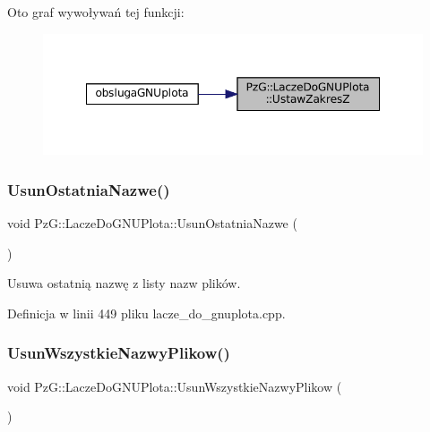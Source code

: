 Oto graf wywoływań tej funkcji\+:\nopagebreak
\begin{figure}[H]
\begin{center}
\leavevmode
\includegraphics[width=348pt]{class_pz_g_1_1_lacze_do_g_n_u_plota_a1dbbb2b86fb13b8632e6bad9df2a82e3_icgraph}
\end{center}
\end{figure}
\mbox{\label{class_pz_g_1_1_lacze_do_g_n_u_plota_a75f599f17413ea8602c6dbba09f36407}} 
\subsubsection{\texorpdfstring{UsunOstatniaNazwe()}{UsunOstatniaNazwe()}}
{\footnotesize\ttfamily void Pz\+G\+::\+Lacze\+Do\+G\+N\+U\+Plota\+::\+Usun\+Ostatnia\+Nazwe (\begin{DoxyParamCaption}{ }\end{DoxyParamCaption})}

Usuwa ostatnią nazwę z listy nazw plików. 

Definicja w linii 449 pliku lacze\+\_\+do\+\_\+gnuplota.\+cpp.

\mbox{\label{class_pz_g_1_1_lacze_do_g_n_u_plota_a89a1d90d017d264cd26398464d074073}} 
\subsubsection{\texorpdfstring{UsunWszystkieNazwyPlikow()}{UsunWszystkieNazwyPlikow()}}
{\footnotesize\ttfamily void Pz\+G\+::\+Lacze\+Do\+G\+N\+U\+Plota\+::\+Usun\+Wszystkie\+Nazwy\+Plikow (\begin{DoxyParamCaption}{ }\end{DoxyParamCaption})}

